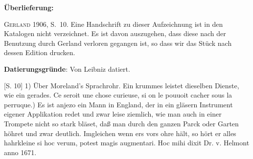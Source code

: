       
               
                \begin{ledgroupsized}[r]{120mm}
                \footnotesize 
                \pstart                
                \noindent\textbf{\"{U}berlieferung:}   
                \pend
                \end{ledgroupsized}
            
              
                            \begin{ledgroupsized}[r]{114mm}
                            \footnotesize 
                            \pstart \parindent -6mm
                            \cite{00243}\textsc{Gerland} 1906, S.~10. Eine Handschrift zu dieser Aufzeichnung ist in den Katalogen nicht verzeichnet. Es ist davon auszugehen, dass diese nach der Benutzung durch \cite{00243}Gerland verloren gegangen ist, so dass wir das St\"{u}ck nach dessen Edition drucken. \pend
                            \end{ledgroupsized}
                \vspace*{5mm}
                \begin{ledgroup}
                \footnotesize 
                \pstart
            \noindent\footnotesize{\textbf{Datierungsgr\"{u}nde}: Von Leibniz datiert.}
                \pend
                \end{ledgroup}
            
                \vspace*{8mm}
                \pstart 
                \normalsize
            [S. 10] 1) \"{U}ber Moreland's\protect{} Sprachrohr\protect{}. Ein krummes leistet dieselben Dienste, wie ein gerades. Ce seroit une chose curieuse, si on le pouuoit cacher sous la perruque.\pend {}) Es ist anjezo ein Mann in England\protect{}, der in ein gl\"{a}sern Instrument eigener Applikation redet und zwar leise ziemlich, wie man auch in einer Trompete nicht so stark bl\"{a}set, daß man durch den ganzen Parck oder Garten h\"{o}hret und zwar deutlich. Imgleichen wenn ers vors ohre h\"{a}lt, so h\"{o}rt er alles hahrkleine si hoc verum, potest magis augmentari. Hoc mihi dixit Dr. v. Helmont\protect{} anno 1671.\pend 